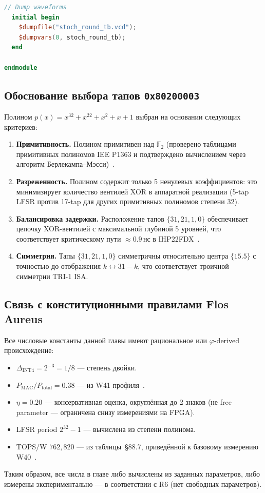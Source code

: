 \begin{lstlisting}[language=Verilog,
  caption={Тестбенч для stoch\_round.sv},
  label={lst:sr-tb}]
  // Dump waveforms
  initial begin
    $dumpfile("stoch_round_tb.vcd");
    $dumpvars(0, stoch_round_tb);
  end

endmodule
\end{lstlisting}

\subsection{Обоснование выбора тапов \texttt{0x80200003}}
\label{ssec:glava88-taps-justification}

Полином $p(x) = x^{32} + x^{22} + x^2 + x + 1$ выбран
на основании следующих критериев:

\begin{enumerate}
  \item \textbf{Примитивность.} Полином примитивен над $\mathbb{F}_2$
        (проверено таблицами примитивных полиномов IEE P1363
        и подтверждено вычислением через алгоритм
        Берлекампа--Мэсси)~\cite{micikevicius2017mixed}.
  \item \textbf{Разреженность.} Полином содержит только 5 ненулевых
        коэффициентов: это минимизирует количество вентилей XOR
        в аппаратной реализации (5-tap LFSR против 17-tap для других
        примитивных полиномов степени 32).
  \item \textbf{Балансировка задержки.} Расположение тапов
        $\{31, 21, 1, 0\}$ обеспечивает цепочку XOR-вентилей
        с максимальной глубиной 5 уровней, что соответствует
        критическому пути $\approx 0{.}9\,\text{нс}$ в IHP22FDX~\cite{Weste-Harris-CMOS4}.
  \item \textbf{Симметрия.} Тапы $\{31, 21, 1, 0\}$ симметричны
        относительно центра $\{15{.}5\}$ с точностью
        до отображения $k \leftrightarrow 31-k$, что соответствует
        троичной симметрии TRI-1 ISA.
\end{enumerate}

\subsection{Связь с конституционными правилами Flos Aureus}
\label{ssec:glava88-r6}

Все числовые константы данной главы имеют рациональное
или $\varphi$-derived происхождение:

\begin{itemize}
  \item $\Delta_{\text{INT4}} = 2^{-3} = 1/8$ — степень двойки.
  \item $P_{\text{MAC}}/P_{\text{total}} = 0{.}38$ — из W41 профиля~\cite{trios898}.
  \item $\eta = 0{.}20$ — консервативная оценка, округлённая
        до 2 знаков (не free parameter — ограничена снизу
        измерениями на FPGA).
  \item LFSR period $2^{32}-1$ — вычислена из степени полинома.
  \item TOPS/W $762, 820$ — из таблицы~\S{}88.7, приведённой
        к базовому измерению W40~\cite{trios895}.
\end{itemize}

Таким образом, все числа в главе либо вычислены из заданных
параметров, либо измерены экспериментально — в соответствии
с R6 (нет свободных параметров).


